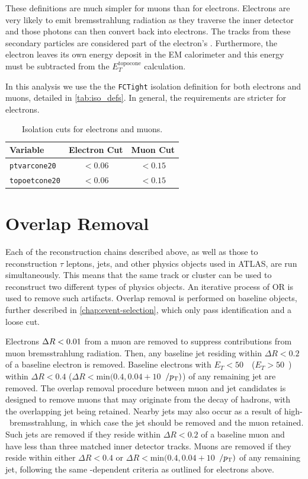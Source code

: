 These definitions are much simpler for muons than for electrons. Electrons are very likely to emit bremsstrahlung radiation as they traverse the inner detector and those photons can then convert back into electrons. The tracks from these secondary particles are considered part of the electron's \pT. Furthermore, the electron leaves its own energy deposit in the \ac{EM} calorimeter and this energy must be subtracted from the $E_{T}^{\textrm{topocone}}$ calculation.


In this analysis we use the the \texttt{FCTight} isolation definition for both electrons and muons, detailed in \autoref{tab:iso_defs}. In general, the requirements are stricter for electrons. 


\begin{table}
\centering
\begin{tabular}{lcc}
Variable & Electron Cut & Muon Cut  \\
\hline
\texttt{ptvarcone20}   & $< 0.06$   & $ < 0.15$ \\
\texttt{topoetcone20} &  $< 0.06$   & $ < 0.15$\\
\hline
\end{tabular}
\caption{Isolation cuts for electrons and muons.}
\label{tab:iso_defs}
\end{table}




\section{Overlap Removal}
Each of the reconstruction chains described above, as well as those to reconstruction $\tau$ leptons, jets, and other physics objects used in \ac{ATLAS}, are run simultaneously. This means that the same track or cluster can be used to reconstruct two different types of physics objects. An iterative process of \ac{OR} is used to remove such artifacts. Overlap removal is performed on baseline objects, further described in \autoref{chap:event-selection}, which only pass identification and a loose \pt cut. 

Electrons $\Delta R < 0.01$ from a muon are removed to suppress contributions from muon bremsstrahlung radiation. Then, any baseline jet residing within $\Delta R < 0.2$ of a baseline electron is removed.  Baseline electrons with $E_{T}<50$~\GeV\ ($E_{T}>50$~\GeV) within $\Delta R < 0.4$ ($\Delta R < \mathrm{min}(0.4,0.04+10$~\GeV$/p_{\text{T}})$) of any remaining jet are removed. The overlap removal procedure between muon and jet candidates is designed to remove muons that may originate from the decay of hadrons, with the overlapping jet being retained. Nearby jets may also occur as a result of high-\pt\ bremsstrahlung, in which case the jet should be removed and the muon retained. Such jets are removed if they reside within $\Delta R < 0.2$ of a baseline muon and have less than three matched inner detector tracks. Muons are removed if they reside within either $\Delta R < 0.4$ or $\Delta R < \mathrm{min}(0.4,0.04+10$~\GeV$/p_{\text{T}})$ of any remaining jet, following the same \pt-dependent criteria as outlined for electrons above.



